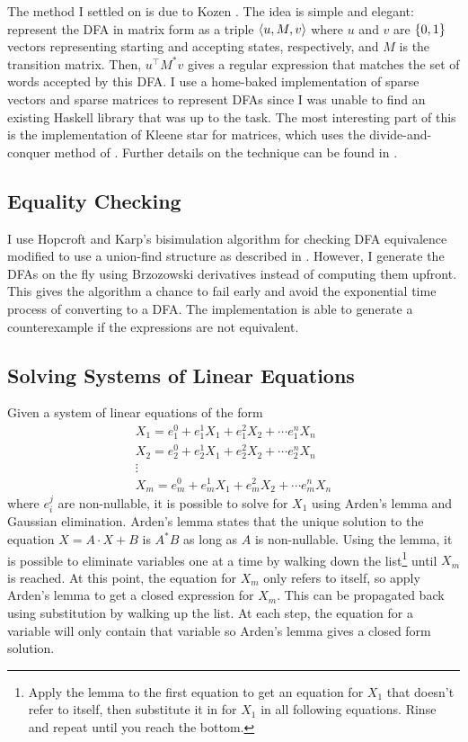 \documentclass[11pt]{article}
\newcommand{\transpose}{^\top}
\begin{document}
  The method I settled on is due to Kozen \cite{Kozen94}. The idea is simple and elegant: represent the DFA in matrix form as a triple $\langle u, M, v\rangle$ where $u$ and $v$ are $\lbrace0, 1\rbrace$ vectors representing starting and accepting states, respectively, and $M$ is the transition matrix. Then, $u\transpose M^* v$ gives a regular expression that matches the set of words accepted by this DFA\@. I use a home-baked implementation of sparse vectors and sparse matrices to represent DFAs since I was unable to find an existing Haskell library that was up to the task. The most interesting part of this is the implementation of Kleene star for matrices, which uses the divide-and-conquer method of \cite{Kozen94}. Further details on the technique can be found in \cite{Kozen94}.


\subsection{Equality Checking}

I use Hopcroft and Karp's bisimulation algorithm for checking DFA equivalence \cite{HopcroftK71} modified to use a union-find structure as described in \cite{BonchiP11}. However, I generate the DFAs on the fly using Brzozowski derivatives instead of computing them upfront. This gives the algorithm a chance to fail early and avoid the exponential time process of converting to a DFA\@. The implementation is able to generate a counterexample if the expressions are not equivalent.


\subsection{Solving Systems of Linear Equations}

Given a system of linear equations of the form
\begin{gather*}
  X_1 = e_1^0 + e_1^1 X_1 + e_1^2 X_2 + \cdots e_1^n X_n\\
  X_2 = e_2^0 + e_2^1 X_1 + e_2^2 X_2 + \cdots e_2^n X_n\\
      \vdots\\
  X_m = e_m^0 + e_m^1 X_1 + e_m^2 X_2 + \cdots e_m^n X_n
\end{gather*}
where $e_i^j$ are non-nullable, it is possible to solve for $X_1$ using Arden's lemma and Gaussian elimination. Arden's lemma states that the unique solution to the equation $X = A \cdot X + B$ is $A^* B$ as long as $A$ is non-nullable. Using the lemma, it is possible to eliminate variables one at a time by walking down the list\footnote{%
Apply the lemma to the first equation to get an equation for $X_1$ that doesn't refer to itself, then substitute it in for $X_1$ in all following equations. Rinse and repeat until you reach the bottom.} until $X_m$ is reached. At this point, the equation for $X_m$ only refers to itself, so apply Arden's lemma to get a closed expression for $X_m$. This can be propagated back using substitution by walking up the list. At each step, the equation for a variable will only contain that variable so Arden's lemma gives a closed form solution.
\end{document}
